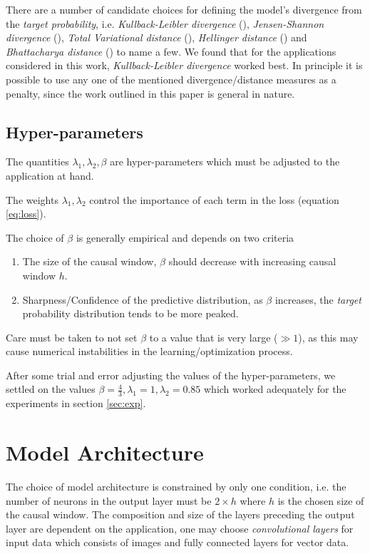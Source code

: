 \documentclass[twoside]{article}
\begin{document}
There are a number of candidate choices for defining the model's divergence from the \emph{target probability}, i.e.  \emph{Kullback-Leibler divergence} (\cite{kullback1951}), \emph{Jensen-Shannon divergence} (\cite{jensen-shannon}), \emph{Total Variational distance} (\cite{Villani2009}), \emph{Hellinger distance} (\cite{hellinger}) and \emph{Bhattacharya distance} (\cite{bhattacharyya}) to name a few. We found that for the applications considered in this work, \emph{Kullback-Leibler divergence} worked best. In principle it is possible to use any one of the mentioned divergence/distance measures as a penalty, since the work outlined in this paper is general in nature.

\subsection{Hyper-parameters}

The quantities $\lambda_1, \lambda_2, \beta$ are hyper-parameters which must be adjusted to the application at hand.

The weights $\lambda_1, \lambda_2$ control the importance of each term in the loss (equation \ref{eq:loss}).

The choice of $\beta$ is generally empirical and depends on two criteria 
\begin{enumerate} \item The size of the causal window, $\beta$ should decrease with increasing causal window $h$. 
\item Sharpness/Confidence of the predictive distribution, as $\beta$ increases, the \emph{target} probability distribution tends to be more peaked.  \end{enumerate}

Care must be taken to not set $\beta$ to a value that is very large ($\gg 1$), as this may cause numerical instabilities in the learning/optimization process. 

After some trial and error adjusting the values of the hyper-parameters, we settled on the values $\beta = \frac{4}{3}, \lambda_1 = 1, \lambda_2 = 0.85$ which worked adequately for the experiments in section \ref{sec:exp}.

\section{Model Architecture}

The choice of model architecture is constrained by only one condition, i.e. the number of neurons in the output layer must be $2 \times h$ where $h$ is the chosen size of the causal window. The composition and size of the layers preceding the output layer are dependent on the application, one may choose \emph{convolutional layers} for input data which consists of images and fully connected layers for vector data.
\end{document}
